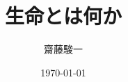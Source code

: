 \documentclass[a4paper,11pt]{jsarticle}
\begin{document}
\title{生命とは何か}
\author{齋藤駿一}
\date{\today}
\maketitle






\end{document}
